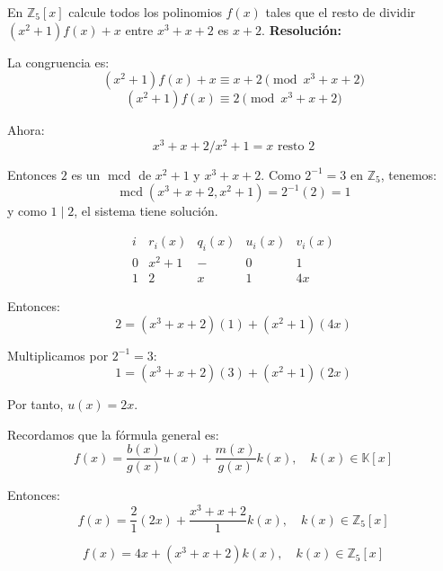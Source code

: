\documentclass[a4paper,12pt]{article}
\begin{document}
\begin{ejercicio}[title=Ejercicio 54]
En $\mathbb{Z}_5[x]$ calcule todos los polinomios $f(x)$ tales que el resto de dividir $(x^2 + 1)f(x) + x$ entre $x^3 + x + 2$ es $x + 2$.
\tcblower
\textbf{Resolución:}

La congruencia es:
\[
(x^2 + 1)f(x) + x \equiv x + 2 \pmod{x^3 + x + 2}
\]
\[
(x^2 + 1)f(x) \equiv 2 \pmod{x^3 + x + 2}
\]

Ahora:
\[
x^3 + x + 2 / x^2 + 1 = x \text{ resto } \boxed{2}
\]

Entonces $2$ es un $\operatorname{mcd}$ de $x^2 + 1$ y $x^3 + x + 2$.  
Como $2^{-1} = 3$ en $\mathbb{Z}_5$, tenemos:
\[
\operatorname{mcd}(x^3 + x + 2, x^2 + 1) = 2^{-1}(2) = 1
\]
y como $1 \mid 2$, el sistema tiene solución.

\[
\begin{array}{c|c|c|c|c}
i & r_i(x) & q_i(x) & u_i(x) & v_i(x) \\ \hline
0 & x^2 + 1 & - & 0 & 1 \\
1 & \boxed{2} & x & 1 & 4x
\end{array}
\]

Entonces:
\[
\boxed{2} = (x^3 + x + 2)(1) + (x^2 + 1)(4x)
\]

Multiplicamos por $2^{-1} = 3$:
\[
1 = (x^3 + x + 2)(3) + (x^2 + 1)(2x)
\]

Por tanto, $u(x) = 2x$.

Recordamos que la fórmula general es:
\[
f(x) = \frac{b(x)}{g(x)} u(x) + \frac{m(x)}{g(x)} k(x), \quad k(x) \in \mathbb{K}[x]
\]

Entonces:
\[
f(x) = \frac{2}{1}(2x) + \frac{x^3 + x + 2}{1}k(x), \quad k(x) \in \mathbb{Z}_5[x]
\]

\[
\boxed{f(x) = 4x + (x^3 + x + 2)k(x)}, \quad k(x) \in \mathbb{Z}_5[x]
\]
\end{ejercicio}
\end{document}
